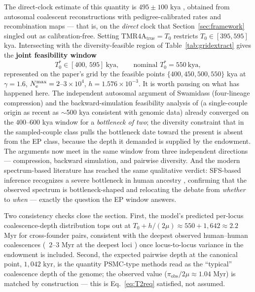 The direct-clock estimate of this quantity is $495 \pm 100$ kya
\citep{Swamidass2019,Swamidass2022}, obtained from autosomal coalescent
reconstructions with pedigree-calibrated rates and recombination maps
--- that is, on the \emph{direct} clock that Section~\ref{sec:framework}
singled out as calibration-free. Setting
$\mathrm{TMR4A}_{\mathrm{true}} = T_0$ restricts
$T_0 \in [395, 595]$ kya. Intersecting with the diversity-feasible region
of Table~\ref{tab:gridextract} gives the \textbf{joint feasibility window}
\begin{equation}\label{eq:window}
T_0^{*} \in [400,\,595]\ \text{kya},
\qquad \text{nominal } T_0^{*} = 550\ \text{kya},
\end{equation}
represented on the paper's grid by the feasible points $\{400, 450, 500,
550\}$ kya at $\gamma = 1.6$, $N_{\mathrm{e}}^{\max} = 2$--$3\times10^4$,
$h = 1.576\times10^{-3}$. It is worth pausing on what has happened here.
The independent autosomal argument of Swamidass (four-lineage compression)
and the backward-simulation feasibility analysis of \citet{HossjerGauger2019}
(a single-couple origin as recent as $\sim$500 kya consistent with genomic
data) already converged on the $400$--$600$ kya window for a \emph{bottleneck
of two}; the diversity constraint that in the sampled-couple class pulls the
bottleneck date toward the present is absent from the EP class, because the
depth it demanded is supplied by the endowment. The arguments now meet in
the same window from three independent directions --- compression,
backward simulation, and pairwise diversity. And the modern spectrum-based
literature has reached the same qualitative verdict: SFS-based inference
recognizes a severe bottleneck in human ancestry \citep{Hu2023}, confirming
that the observed spectrum is bottleneck-shaped and relocating the debate
from \emph{whether} to \emph{when} --- exactly the question the EP window
answers.

Two consistency checks close the section. First, the model's predicted
per-locus coalescence-depth distribution tops out at
$T_0 + h/(2\mu) \approx 550 + 1{,}642 \approx 2.2$ Myr for cross-founder
pairs, consistent with the deepest observed human--human coalescences
(~$2$--$3$ Myr at the deepest loci
\citep{GarriganHammer2005,LiDurbin2011}) once locus-to-locus variance in
the endowment is included. Second, the expected pairwise depth at the
canonical point, $1{,}042$ kyr, is the quantity PSMC-type methods read as
the ``typical'' coalescence depth of the genome; the observed value
($\pi_{\mathrm{obs}}/2\mu \approx 1.04$ Myr) is matched by construction
--- this is Eq.~\eqref{eq:T2req} satisfied, not assumed.
